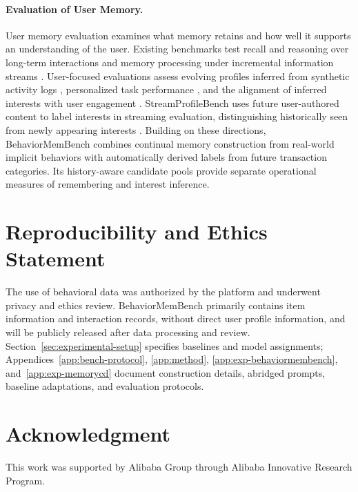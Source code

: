 \documentclass[sigconf,nonacm,balance=false]{acmart}
\begin{document}
\paragraph{\textbf{Evaluation of User Memory.}}
User memory evaluation examines what memory retains and how well it supports an understanding of the user.
Existing benchmarks test recall and reasoning over long-term interactions \citep{maharana2024evaluatinglongtermconversationalmemory,wu2025longmemevalbenchmarkingchatassistants,tan2025membench,bian2026realmem} and memory processing under incremental information streams \citep{hu2026evaluatingmemoryllmagents}.
User-focused evaluations assess evolving profiles inferred from synthetic activity logs \citep{xie2026dynamicmemlonghorizonmemorybenchmark,jiang2025know}, personalized task performance \citep{salemi2024lamplargelanguagemodels}, and the alignment of inferred interests with user engagement \citep{fostiropoulos2026gistbenchevaluatingllmuser}.
StreamProfileBench uses future user-authored content to label interests in streaming evaluation, distinguishing historically seen from newly appearing interests \citep{wang2026streamprofilebenchbenchmarkfinegraineduser}.
Building on these directions, BehaviorMemBench combines continual memory construction from real-world implicit behaviors with automatically derived labels from future transaction categories.
Its history-aware candidate pools provide separate operational measures of remembering and interest inference.




\section*{Reproducibility and Ethics Statement}
The use of behavioral data was authorized by the platform and underwent privacy and ethics review. BehaviorMemBench primarily contains item information and interaction records, without direct user profile information, and will be publicly released after data processing and review. Section~\ref{sec:experimental-setup} specifies baselines and model assignments; Appendices~\ref{app:bench-protocol}, \ref{app:method}, \ref{app:exp-behaviormembench}, and~\ref{app:exp-memorycd} document construction details, abridged prompts, baseline adaptations, and evaluation protocols.


\section*{Acknowledgment}
This work was supported by Alibaba Group through Alibaba Innovative Research Program.
\end{document}
